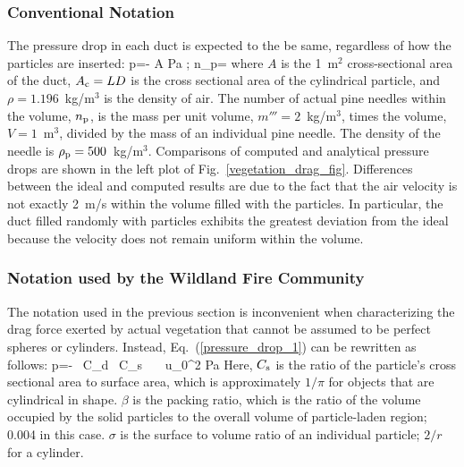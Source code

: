 \documentclass[11pt]{book}
\begin{document}
\subsubsection{Conventional Notation}

The pressure drop in each duct is expected to the be same, regardless of how the particles are inserted:
\be
   \Delta p=- \rho {} {A}  \; {\rm Pa}  \quad ; \quad n_{\rm p}=   \label{pressure_drop_1}
\ee
where $A$ is the 1~m$^2$ cross-sectional area of the duct, $A_{\rm c}=LD$ is the cross sectional area of the cylindrical particle, and $\rho=1.196$~kg/m$^3$ is the density of air. The number of actual pine needles within the volume, $n_{\rm p}$, is the mass per unit volume, $m'''=2$~kg/m$^3$, times the volume, $V=1$~m$^3$, divided by the mass of an individual pine needle. The density of the needle is $\rho_{\rm p}=500$~kg/m$^3$. Comparisons of computed and analytical pressure drops are shown in the left plot of Fig.~\ref{vegetation_drag_fig}. Differences between the ideal and computed results are due to the fact that the air velocity is not exactly 2~m/s within the volume filled with the particles. In particular, the duct filled randomly with particles exhibits the greatest deviation from the ideal because the velocity does not remain uniform within the volume.

\subsubsection{Notation used by the Wildland Fire Community}

The notation used in the previous section is inconvenient when characterizing the drag force exerted by actual vegetation that cannot be assumed to be perfect spheres or cylinders. Instead, Eq.~(\ref{pressure_drop_1}) can be rewritten as follows:
\be
   \Delta p=- \rho \, C_{\rm d} \, C_{\rm s} \, \beta \, \sigma \, u_0^2  \; {\rm Pa}  \label{pressure_drop_2}
\ee
Here, $C_{\rm s}$ is the ratio of the particle's cross sectional area to surface area, which is approximately $1/\pi$ for objects that are cylindrical in shape. $\beta$ is the packing ratio, which is the ratio of the volume occupied by the solid particles to the overall volume of particle-laden region; 0.004 in this case. $\sigma$ is the surface to volume ratio of an individual particle; $2/r$ for a cylinder.
\end{document}
